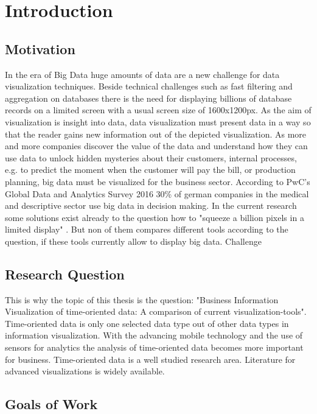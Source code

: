 \chapter{Introduction}
\label{chap:introduction}

\section{Motivation}
In the era of Big Data huge amounts of data are a new challenge for data visualization techniques. Beside technical challenges such as fast filtering and aggregation on databases there is the need for displaying billions of database records on a limited screen with a usual screen size of 1600x1200px. As the aim of visualization is insight into data, data visualization must present data in a way so that the reader gains new information out of the depicted visualization. 
As more and more companies discover the value of the data and understand how they can use data to unlock hidden mysteries about their customers, internal processes, e.g. to predict the moment when the customer will pay the bill, or production planning, big data must be visualized for the business sector. According to PwC's Global Data and Analytics Survey 2016 30\% of german companies in the medical and descriptive sector use big data in decision making. %
In the current research some solutions exist already to the question how to "squeeze a billion pixels in a limited display" . But non of them compares different tools according to the question, if these tools currently allow to display big data. 
Challenge


\section{Research Question}
This is why the topic of this thesis is the question: "Business Information Visualization of time-oriented data: A comparison of current visualization-tools".
Time-oriented data is only one selected data type out of other data types in information visualization. With the advancing mobile technology and the use of sensors for analytics the analysis of time-oriented data becomes more important for business. Time-oriented data is a well studied research area. Literature for advanced visualizations is widely available. 

\section{Goals of Work}

